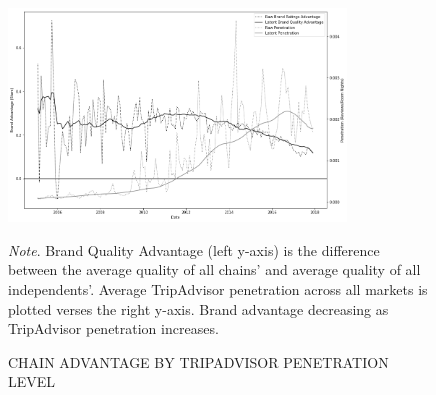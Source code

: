 \documentclass[mksc,blindrev]{informs3} %
\begin{document}
\begin{figure}[htp]
 \centering  
\includegraphics[width=0.8\textwidth,height=\textheight,keepaspectratio]{./Figures/OTA_Brand_v_Chain_v_PenetrationV2.png} 

\begin{flushleft}
\small
\textit{Note}. Brand Quality Advantage (left y-axis) is the difference between the average quality of all chains' and average quality of all independents'. Average TripAdvisor penetration across all markets is plotted verses the right y-axis. Brand advantage decreasing as TripAdvisor penetration increases.
\end{flushleft}

\caption{CHAIN ADVANTAGE BY TRIPADVISOR PENETRATION LEVEL}
\label{fig:modelfree}

\end{figure}
\clearpage
\end{document}

